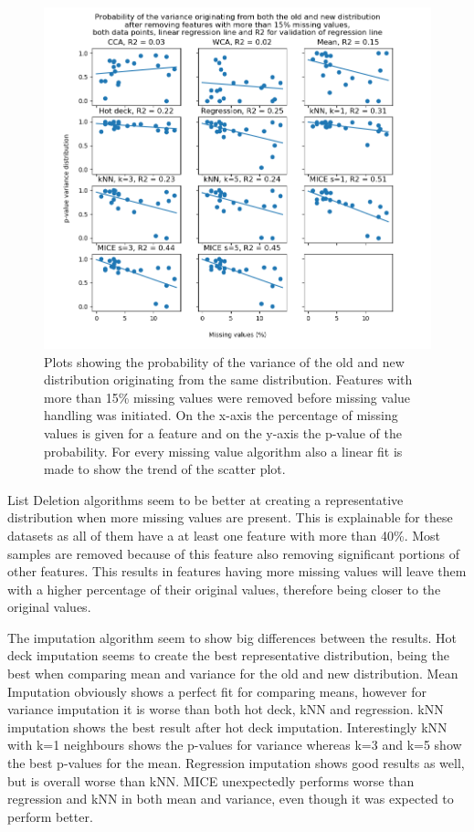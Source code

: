 \documentclass[10pt,a4paper]{report}
\begin{document}
	\begin{figure}[H]
		\centering
		\includegraphics[width=\textwidth]{Var_Dist_Extra_ACA.PNG}
		\caption{Plots showing the probability of the variance of the old and new distribution originating from the same distribution. Features with more than 15\% missing values were removed before missing value handling was initiated. On the x-axis the percentage of missing values is given for a feature and on the y-axis the p-value of the probability. For every missing value algorithm also a linear fit is made to show the trend of the scatter plot.}
		\label{fig:PVarianceFitsACA}
	\end{figure}
	
	List Deletion algorithms seem to be better at creating a representative distribution when more missing values are present. This is explainable for these datasets as all of them have a at least one feature with more than 40\%. Most samples are removed because of this feature also removing significant portions of other features. This results in features having more missing values will leave them with a higher percentage of their original values, therefore being closer to the original values.
	
	The imputation algorithm seem to show big differences between the results. Hot deck imputation seems to create the best representative distribution, being the best when comparing mean and variance for the old and new distribution. Mean Imputation obviously shows a perfect fit for comparing means, however for variance imputation it is worse than both hot deck, kNN and regression. kNN imputation shows the best result after hot deck imputation. Interestingly kNN with k=1 neighbours shows the p-values for variance whereas k=3 and k=5 show the best p-values for the mean. Regression imputation shows good results as well, but is overall worse than kNN. MICE unexpectedly performs worse than regression and kNN in both mean and variance, even though it was expected to perform better.
	
\end{document}
